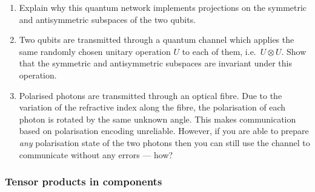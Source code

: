 \documentclass[fleqn]{article}
\begin{document}
\begin{enumerate}
\def\labelenumi{\arabic{enumi}.}
\setcounter{enumi}{3}
\item
  Explain why this quantum network implements projections on the symmetric and antisymmetric subspaces of the two qubits.
\item
  Two qubits are transmitted through a quantum channel which applies the same randomly chosen unitary operation \(U\) to each of them, i.e.~\(U\otimes U\).
  Show that the symmetric and antisymmetric subspaces are invariant under this operation.
\item
  Polarised photons are transmitted through an optical fibre.
  Due to the variation of the refractive index along the fibre, the polarisation of each photon is rotated by the same unknown angle.
  This makes communication based on polarisation encoding unreliable.
  However, if you are able to prepare \emph{any} polarisation state of the two photons then you can still use the channel to communicate without any errors --- how?
\end{enumerate}

\hypertarget{tensor-products-in-components}{%
\subsubsection{Tensor products in components}\label{tensor-products-in-components}}
\end{document}

